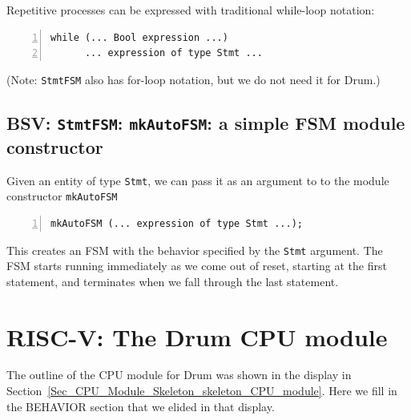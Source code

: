 
Repetitive processes can be expressed with traditional while-loop notation:
\begin{Verbatim}[frame=single, numbers=left]
   while (... Bool expression ...)
      ... expression of type Stmt ...
\end{Verbatim}

(Note: \verb|StmtFSM| also has for-loop notation, but we do not need it for Drum.)


\subsection{BSV: {\tt StmtFSM}: {\tt mkAutoFSM}: a simple FSM module constructor}


Given an entity of type \verb|Stmt|, we can pass it as an argument to
to the module constructor \verb|mkAutoFSM|

\begin{Verbatim}[frame=single, numbers=left]
   mkAutoFSM (... expression of type Stmt ...);
\end{Verbatim}

This creates an FSM with the behavior specified by the \verb|Stmt|
argument.  The FSM starts running immediately as we come out of reset,
starting at the first statement, and terminates when we fall through
the last statement.


\section{RISC-V: The Drum CPU module}

\label{Sec_FSMs_Drum_CPU_module}


The outline of the CPU module for Drum was shown in the display in
Section~\ref{Sec_CPU_Module_Skeleton_skeleton_CPU_module}.  Here we
fill in the BEHAVIOR section that we elided in that display.

